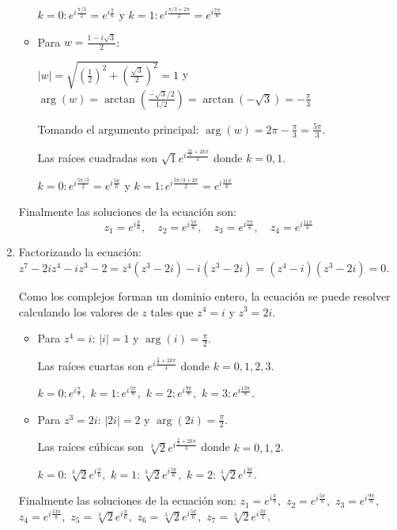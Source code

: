 \begin{prob}
\begin{myproof}
\begin{enumerate}[$a)$]
\begin{itemize}
$k=0:   e^{i\frac{\pi/3}{2}} = \boxed{e^{i\frac{\pi}{6}}}$ y $k=1: e^{i\frac{\pi/3+2\pi}{2}} = \boxed{e^{i\frac{7\pi}{6}}}$

\item Para $w=\frac{1-i\sqrt{3}}{2}$:

$|w| = \sqrt{\left( \frac{1}{2} \right)^2 + \left( \frac{\sqrt{3}}{2} \right)^2} = 1$ y $\arg(w) = \arctan\left( \frac{-\sqrt{3}/2}{1/2} \right) = \arctan(-\sqrt{3}) = -\frac{\pi}{3}$


Tomando el argumento principal: $\arg(w) = 2\pi - \frac{\pi}{3} = \frac{5\pi}{3}$.

Las raíces cuadradas son $\sqrt{1} e^{i\frac{\frac{5\pi}{3}+2k\pi}{2}}$ donde $k=0,1$.

$k=0:  e^{i\frac{5\pi/3}{2}} = \boxed{e^{i\frac{5\pi}{6}}}$ y  $k=1: e^{i\frac{5\pi/3+2\pi}{2}} = \boxed{e^{i\frac{11\pi}{6}}}$
\end{itemize}

Finalmente las soluciones de la ecuación son:
$$z_1 = e^{i\frac{\pi}{6}}, \quad z_2 = e^{i\frac{5\pi}{6}}, \quad z_3 = e^{i\frac{7\pi}{6}}, \quad z_4 = e^{i\frac{11\pi}{6}}$$

\item Factorizando la ecuación: $z^7-2iz^4-iz^3-2=z^4(z^3-2i)-i(z^3-2i)=(z^4-i)(z^3-2i)= 0.$

Como los complejos forman un dominio entero, la ecuación se puede resolver calculando los valores de $z$ tales que $z^4=i$ y $z^3=2i$.

\begin{itemize}
\item Para $z^4=i$: $|i|=1$ y $\arg(i)=\frac{\pi}{2}$.

Las raíces cuartas son $e^{i\frac{\frac{\pi}{2}+2k\pi}{4}}$ donde $k=0,1,2,3$.

$k=0:\boxed{e^{i\frac{\pi}{8}}},$ $k=1: \boxed{e^{i\frac{5\pi}{8}}},$ $k=2: \boxed{e^{i\frac{9\pi}{8}}},$ $k=3: \boxed{e^{i\frac{13\pi}{8}}}.$

\item Para $z^3=2i$: $|2i|=2$ y $\arg(2i)=\frac{\pi}{2}$.

Las raíces cúbicas son $\sqrt[3]{2} e^{i\frac{\frac{\pi}{2}+2k\pi}{3}}$ donde $k=0,1,2$.

$k=0: \boxed{\sqrt[3]{2}e^{i\frac{\pi}{6}}},$ $k=1: \boxed{\sqrt[3]{2}e^{i\frac{5\pi}{6}}},$ $k=2: \boxed{\sqrt[3]{2}e^{i\frac{3\pi}{2}}}.$
\end{itemize}

Finalmente las soluciones de la ecuación son:
$z_1 = e^{i\frac{\pi}{8}},$ $z_2 = e^{i\frac{5\pi}{8}},$ $z_3 = e^{i\frac{9\pi}{8}},$ $z_4 = e^{i\frac{13\pi}{8}},$ $z_5 = \sqrt[3]{2}e^{i\frac{\pi}{6}},$ $z_6 = \sqrt[3]{2}e^{i\frac{5\pi}{6}},$ $z_7 = \sqrt[3]{2}e^{i\frac{3\pi}{2}}.$
\end{enumerate}
\end{myproof}
\end{prob}




